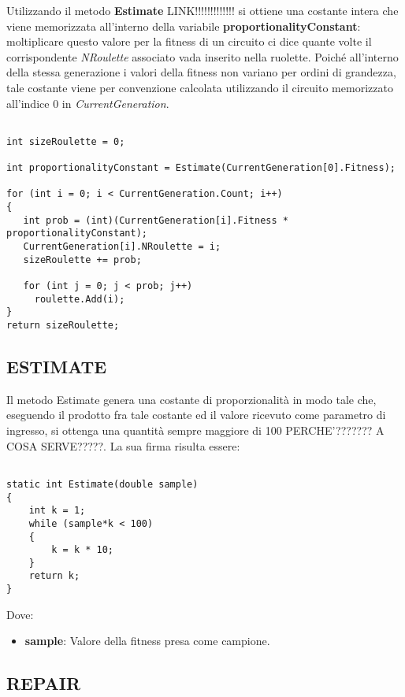 \documentclass[11pt]{article}
\begin{document}
Utilizzando il metodo \textbf{Estimate} LINK!!!!!!!!!!!!! si ottiene una costante intera che viene memorizzata all'interno della variabile \textbf{proportionalityConstant}: moltiplicare questo valore per la fitness di un circuito ci dice quante volte il corrispondente \textit{NRoulette} associato vada inserito nella ruolette. Poiché all'interno della stessa generazione i valori della fitness non variano per ordini di grandezza, tale costante viene per convenzione calcolata utilizzando il circuito memorizzato all'indice $0$ in \textit{CurrentGeneration}.
\begin{lstlisting}

int sizeRoulette = 0;
            
int proportionalityConstant = Estimate(CurrentGeneration[0].Fitness);

for (int i = 0; i < CurrentGeneration.Count; i++)
{
   int prob = (int)(CurrentGeneration[i].Fitness * proportionalityConstant);
   CurrentGeneration[i].NRoulette = i;
   sizeRoulette += prob;
   
   for (int j = 0; j < prob; j++)
     roulette.Add(i);
}
return sizeRoulette;

\end{lstlisting}

\subsection*{ESTIMATE}
\label{sec:EstimateS}

Il metodo Estimate genera una costante di proporzionalità in modo tale che, eseguendo il prodotto fra tale costante ed il valore ricevuto come parametro di ingresso, si ottenga una quantità sempre maggiore di 100 PERCHE'??????? A COSA SERVE?????. La sua firma risulta essere:

\begin{lstlisting}

static int Estimate(double sample)
{
    int k = 1;
    while (sample*k < 100)
    {
        k = k * 10;
    }
    return k;
}

\end{lstlisting}

Dove:

\begin{itemize}
    \item \textbf{sample}: Valore della fitness presa come campione.
\end{itemize}

\subsection*{REPAIR}
\label{sec:RepairS}
\end{document}
